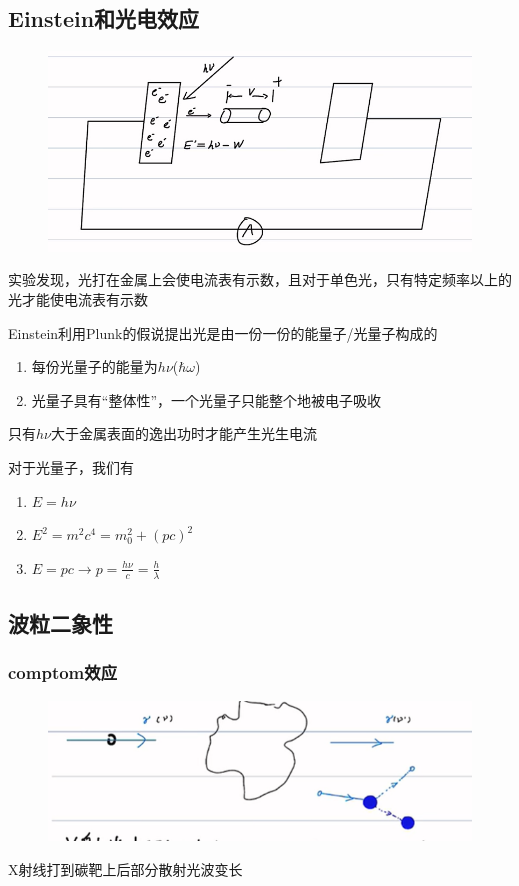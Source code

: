 \documentclass[lang=cn,10pt]{elegantbook}
\begin{document}
\subsection{Einstein和光电效应}
\begin{figure}[H]
	\centering
	\includegraphics[width=0.8\linewidth]{figure/screenshot002}
\end{figure}

实验发现，光打在金属上会使电流表有示数，且对于单色光，只有特定频率以上的光才能使电流表有示数

Einstein利用Plunk的假说提出光是由一份一份的能量子/光量子构成的

\begin{enumerate}
	\item 每份光量子的能量为$h\nu$($\hbar\omega$)
	\item 光量子具有“整体性”，一个光量子只能整个地被电子吸收
\end{enumerate}

只有$h\nu$大于金属表面的逸出功时才能产生光生电流

对于光量子，我们有
\begin{enumerate}
	\item $E=h\nu$
	\item $E^2=m^2c^4=m_0^{2}+(pc)^{2}$
	\item $E=pc\rightarrow p=\frac{h\nu}{c}=\frac{h}{\lambda}$
\end{enumerate}
\subsection{波粒二象性}
\subsubsection{comptom效应}
\begin{figure}[H]
	\centering
	\includegraphics[width=0.7\linewidth]{figure/screenshot003}
\end{figure}
X射线打到碳靶上后部分散射光波变长
\end{document}
